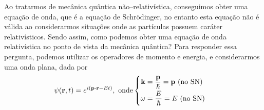 Ao tratarmos de mecânica quântica não--relativística, conseguimos obter uma equação de onda, que é a equação de Schrödinger, no entanto esta equação não é válida ao considerarmos situações onde as partículas possuem caráter relativísticos. Sendo assim, como podemos obter uma equação de onda relativística no ponto de vista da mecânica quântica? Para responder essa pergunta, podemos utilizar os operadores de momento e energia, e considerarmos uma onda plana, dada por
    \begin{equation*}
        \psi(\vb{r},t) = e^{i(\vb{p}\cdot\vb{r} - E t)},\ \text{onde} \begin{cases}\begin{aligned}
            \vb{k} &= \dfrac{\vb{p}}{\hbar} = \vb{p}\ (\text{no SN}) \\
            \omega &= \dfrac{E}{\hbar} = E\ (\text{no SN})
        \end{aligned}
        \end{cases}
    \end{equation*}

